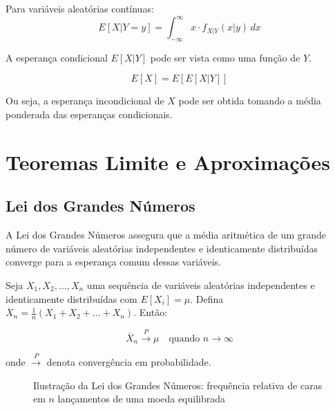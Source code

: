 \documentclass[a4paper,12pt]{article}
\begin{document}
Para variáveis aleatórias contínuas:
\begin{equation}
E[X|Y=y] = \int_{-\infty}^{\infty} x \cdot f_{X|Y}(x|y) \, dx
\end{equation}

A esperança condicional $E[X|Y]$ pode ser vista como uma função de $Y$.

\begin{tcolorbox}[colback=green!5, colframe=green!40, title=\textbf{Lei da Esperança Total}]
\begin{equation}
E[X] = E[E[X|Y]]
\end{equation}

Ou seja, a esperança incondicional de $X$ pode ser obtida tomando a média ponderada das esperanças condicionais.
\end{tcolorbox}

\section{Teoremas Limite e Aproximações}

\subsection{Lei dos Grandes Números}

A Lei dos Grandes Números assegura que a média aritmética de um grande número de variáveis aleatórias independentes e identicamente distribuídas converge para a esperança comum dessas variáveis.

Seja $X_1, X_2, \ldots, X_n$ uma sequência de variáveis aleatórias independentes e identicamente distribuídas com $E[X_i] = \mu$. Defina $\overline{X}_n = \frac{1}{n}(X_1 + X_2 + \ldots + X_n)$. Então:

\begin{equation}
\overline{X}_n \xrightarrow{P} \mu \quad \text{quando } n \to \infty
\end{equation}

onde $\xrightarrow{P}$ denota convergência em probabilidade.

\begin{figure}[H]
\centering
{}
\caption{Ilustração da Lei dos Grandes Números: frequência relativa de caras em $n$ lançamentos de uma moeda equilibrada}
\end{figure}
\end{document}
